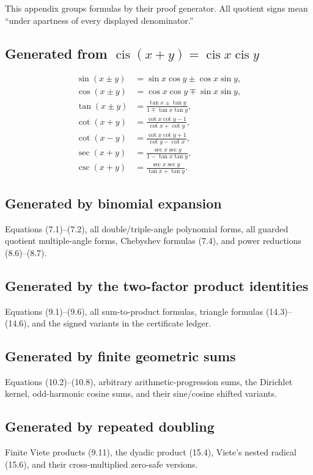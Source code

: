 \documentclass[11pt]{article}
\theoremstyle{definition}
\newcommand{\cis}{\operatorname{cis}}
\begin{document}
This appendix groups formulas by their proof generator.  All quotient signs
mean ``under apartness of every displayed denominator.''

\subsection*{Generated from \(\cis(x+y)=\cis x\cis y\)}
\begin{align*}
\sin(x\pm y)&=\sin x\cos y\pm\cos x\sin y,\\
\cos(x\pm y)&=\cos x\cos y\mp\sin x\sin y,\\
\tan(x\pm y)&=\frac{\tan x\pm\tan y}{1\mp\tan x\tan y},\\
\cot(x+y)&=\frac{\cot x\cot y-1}{\cot x+\cot y},\\
\cot(x-y)&=\frac{\cot x\cot y+1}{\cot y-\cot x},\\
\sec(x+y)&=\frac{\sec x\sec y}{1-\tan x\tan y},\\
\csc(x+y)&=\frac{\sec x\sec y}{\tan x+\tan y}.
\end{align*}

\subsection*{Generated by binomial expansion}
Equations (7.1)--(7.2), all double/triple-angle polynomial forms, all guarded
quotient multiple-angle forms, Chebyshev formulas (7.4), and power reductions
(8.6)--(8.7).

\subsection*{Generated by the two-factor product identities}
Equations (9.1)--(9.6), all sum-to-product formulas, triangle formulas
(14.3)--(14.6), and the signed variants in the certificate ledger.

\subsection*{Generated by finite geometric sums}
Equations (10.2)--(10.8), arbitrary arithmetic-progression sums, the Dirichlet
kernel, odd-harmonic cosine sums, and their sine/cosine shifted variants.

\subsection*{Generated by repeated doubling}
Finite Viete products (9.11), the dyadic product (15.4), Viete's nested radical
(15.6), and their cross-multiplied zero-safe versions.
\end{document}
